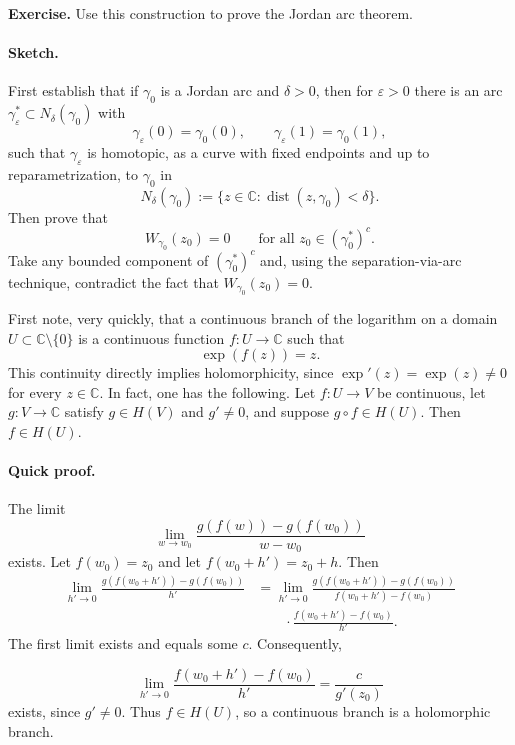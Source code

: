 \documentclass[11pt,a4paper]{article}
\begin{document}
\textbf{Exercise.} Use this construction to prove the Jordan arc theorem.

\paragraph{Sketch.} First establish that if $\gamma_0$ is a Jordan arc and $\delta>0$, then for $\varepsilon>0$ there is an arc \(\gamma_\varepsilon^*\subset N_\delta(\gamma_0)\)
with
\[
  \gamma_\varepsilon(0)=\gamma_0(0),
  \qquad
  \gamma_\varepsilon(1)=\gamma_0(1),
\]
such that $\gamma_\varepsilon$ is homotopic, as a curve with fixed endpoints and up to reparametrization, to $\gamma_0$ in
\[
  N_\delta(\gamma_0):=
  \{z\in\mathbb C:\operatorname{dist}(z,\gamma_0)<\delta\}.
\]
Then prove that
\[
  W_{\gamma_0}(z_0)=0
  \qquad\text{for all }z_0\in(\gamma_0^*)^c.
\]
Take any bounded component of $(\gamma_0^*)^c$ and, using the separation-via-arc technique, contradict the fact that $W_{\gamma_0}(z_0)=0$.



First note, very quickly, that a continuous branch of the logarithm on a domain \(U\subset\mathbb C\setminus\{0\}\) is a continuous function \(f:U\to\mathbb C\) such that
\[
  \exp(f(z))=z.
\]
This continuity directly implies holomorphicity, since $\exp'(z)=\exp(z)\ne0$ for every $z\in\mathbb C$. In fact, one has the following. Let $f:U\to V$ be continuous, let $g:V\to\mathbb C$ satisfy $g\in H(V)$ and $g'\ne0$, and suppose $g\circ f\in H(U)$. Then $f\in H(U)$.

\paragraph{Quick proof.} The limit
\[
  \lim_{w\to w_0}
  \frac{g(f(w))-g(f(w_0))}{w-w_0}
\]
exists. Let $f(w_0)=z_0$ and let $f(w_0+h')=z_0+h$. Then
\begin{align*}
  \lim_{h'\to0}
  \frac{g(f(w_0+h'))-g(f(w_0))}{h'}
  &=\lim_{h'\to0}
  \frac{g(f(w_0+h'))-g(f(w_0))}{f(w_0+h')-f(w_0)}\\
  &\qquad\cdot
  \frac{f(w_0+h')-f(w_0)}{h'}.
\end{align*}
The first limit exists and equals some $c$. Consequently,

\[
  \lim_{h'\to0}
  \frac{f(w_0+h')-f(w_0)}{h'}
  =\frac{c}{g'(z_0)}
\]
exists, since $g'\ne0$. Thus $f\in H(U)$, so a continuous branch is a holomorphic branch.
\end{document}
